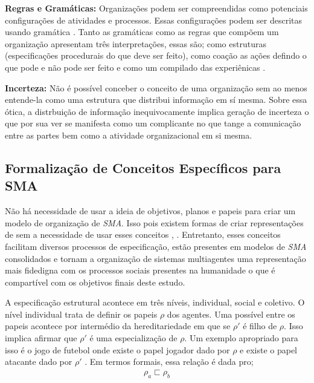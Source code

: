 \textbf{Regras e Gramáticas:} Organizações podem ser compreendidas como potenciais configurações de atividades e processos. Essas configurações podem ser descritas usando gramática \cite{grammarselforganizationmodel} 
\cite{grammarselforganizationmodel2}. Tanto as gramáticas como as regras que compõem um organização apresentam três interpretações, essas são; como estruturas (especificações procedurais do que deve 
ser feito), como coação as ações defindo o que pode e não pode ser feito e como um compilado das experiênicas \cite{organiationofmultiagentsystem}.

\textbf{Incerteza:} Não é possível conceber o conceito de uma organização sem ao menos entende-la como uma estrutura que distribui informação em sí mesma. Sobre essa ótica, a distrbuição de informação
inequivocamente implica geração de incerteza o que por sua ver se manifesta como um complicante no que tange a comunicação entre as partes bem como a atividade organizacional em si mesma.

\subsection{Formalização de Conceitos Específicos para SMA}

Não há necessidade de usar a ideia de objetivos, planos e papeis para criar um modelo de organização de \textit{SMA}. Isso pois existem formas de criar representações
de  sem a necessidade de usar esses conceitos \cite{organiationofmultiagentsystem}, \cite{multiagentsystemmodernapproach}. Entretanto, esses conceitos facilitam diversos processos
de especificação, estão presentes em modelos de \textit{SMA} consolidados \cite{mosieframework} e tornam a organização de sistemas multiagentes uma representação mais fidedigna com os processos
sociais presentes na humanidade o que é compartível com os objetivos finais deste estudo. 


A especificação estrutural acontece em três níveis, individual, social e coletivo. O nível individual trata de definir os papeis $\rho$ dos agentes. Uma possível entre os papeis acontece por 
intermédio da hereditariedade em que se $\rho'$ é filho de $\rho$. Isso implica afirmar que $\rho'$ é uma especialização de $\rho$. Um exemplo apropriado para isso é o jogo de futebol onde 
existe o papel jogador dado por $\rho$ e existe o papel atacante dado por $\rho'$ \cite{mosieframework}. Em termos formais, essa relação é dada pro; 
\begin{eqnarray}\nonumber
\rho_a \sqsubset \rho_b
\end{eqnarray}

